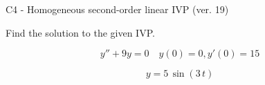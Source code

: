 \begin{exercise}
  \begin{exerciseTitle}C4 - Homogeneous second-order linear IVP (ver. 19)\end{exerciseTitle}
  \begin{exerciseStatement}
    
Find the solution to the given IVP.

    
\[y''+9y = 0 \hspace{1em} y(0) = 0 , y'(0) = 15\]

  \end{exerciseStatement}
  \begin{exerciseAnswer}
    
\[y= 5 \, \sin\left(3 \, t\right)\]

  \end{exerciseAnswer}
\end{exercise}